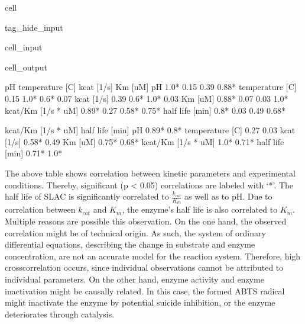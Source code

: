 \documentclass[letterpaper,12pt,english]{jupyterBook}
\begin{document}
\begin{sphinxuseclass}{cell}
\begin{sphinxuseclass}{tag_hide_input}
\begin{sphinxVerbatimInput}
\begin{sphinxuseclass}{cell_input}
\end{sphinxuseclass}\end{sphinxVerbatimInput}
\begin{sphinxVerbatimOutput}

\begin{sphinxuseclass}{cell_output}
\begin{sphinxVerbatim}[commandchars=\\\{\}]
                        pH temperature [C] kcat [1/s] Km [uM]  \PYGZbs{}
pH                    1.0*           \PYGZhy{}0.15      \PYGZhy{}0.39   0.88*   
temperature [C]      \PYGZhy{}0.15            1.0*       0.6*    0.07   
kcat [1/s]           \PYGZhy{}0.39            0.6*       1.0*   \PYGZhy{}0.03   
Km [uM]              0.88*            0.07      \PYGZhy{}0.03    1.0*   
kcat/Km [1/s * uM]  \PYGZhy{}0.89*            0.27      0.58*  \PYGZhy{}0.75*   
half life [min]       0.8*            0.03      \PYGZhy{}0.49   0.68*   

                   kcat/Km [1/s * uM] half life [min]  
pH                             \PYGZhy{}0.89*            0.8*  
temperature [C]                  0.27            0.03  
kcat [1/s]                      0.58*           \PYGZhy{}0.49  
Km [uM]                        \PYGZhy{}0.75*           0.68*  
kcat/Km [1/s * uM]               1.0*          \PYGZhy{}0.71*  
half life [min]                \PYGZhy{}0.71*            1.0*  
\end{sphinxVerbatim}

\end{sphinxuseclass}\end{sphinxVerbatimOutput}

\end{sphinxuseclass}
\end{sphinxuseclass}
\sphinxAtStartPar
The above table shows correlation between kinetic parameters and experimental conditions. Thereby, significant (p < 0.05) correlations are labeled with ‘*’. The half life of SLAC is significantly correlated to \(\frac{k_{cat}}{K_{m}}\) as well as to pH. Due to correlation between \(k_{cat}\) and \(K_{m}\), the enzyme’s half life is also correlated to \(K_{m}\). Multiple reasons are possible this observation. On the one hand, the observed correlation might be of technical origin. As such, the system of ordinary differential equations, describing the change in substrate and enzyme concentration, are not an accurate model for the reaction system. Therefore, high cross\sphinxhyphen{}correlation occurs, since individual observations cannot be attributed to individual parameters. On the other hand, enzyme activity and enzyme inactivation might be causally related. In this case, the formed ABTS radical might inactivate the enzyme by potential suicide inhibition, or the enzyme deteriorates through catalysis.
\end{document}
